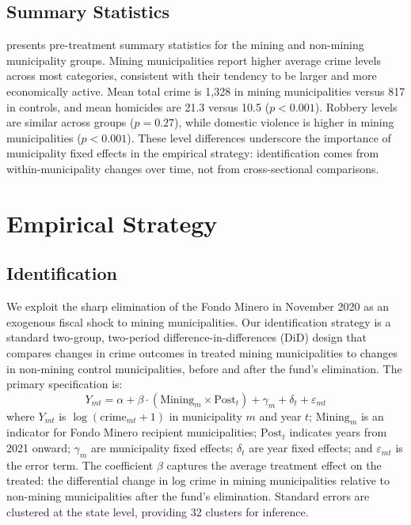 \documentclass[12pt]{article}
\begin{document}
\subsection{Summary Statistics}

 presents pre-treatment summary statistics for the mining and non-mining municipality groups. Mining municipalities report higher average crime levels across most categories, consistent with their tendency to be larger and more economically active. Mean total crime is 1,328 in mining municipalities versus 817 in controls, and mean homicides are 21.3 versus 10.5 ($p < 0.001$). Robbery levels are similar across groups ($p = 0.27$), while domestic violence is higher in mining municipalities ($p < 0.001$). These level differences underscore the importance of municipality fixed effects in the empirical strategy: identification comes from within-municipality changes over time, not from cross-sectional comparisons.




\section{Empirical Strategy}

\subsection{Identification}

We exploit the sharp elimination of the Fondo Minero in November 2020 as an exogenous fiscal shock to mining municipalities. Our identification strategy is a standard two-group, two-period difference-in-differences (DiD) design that compares changes in crime outcomes in treated mining municipalities to changes in non-mining control municipalities, before and after the fund's elimination. The primary specification is:
\begin{equation}
\label{eq:did}
Y_{mt} = \alpha + \beta \cdot (\text{Mining}_m \times \text{Post}_t) + \gamma_m + \delta_t + \varepsilon_{mt}
\end{equation}
where $Y_{mt}$ is $\log(\text{crime}_{mt} + 1)$ in municipality $m$ and year $t$; $\text{Mining}_m$ is an indicator for Fondo Minero recipient municipalities; $\text{Post}_t$ indicates years from 2021 onward; $\gamma_m$ are municipality fixed effects; $\delta_t$ are year fixed effects; and $\varepsilon_{mt}$ is the error term. The coefficient $\beta$ captures the average treatment effect on the treated: the differential change in log crime in mining municipalities relative to non-mining municipalities after the fund's elimination. Standard errors are clustered at the state level, providing 32 clusters for inference.
\end{document}
